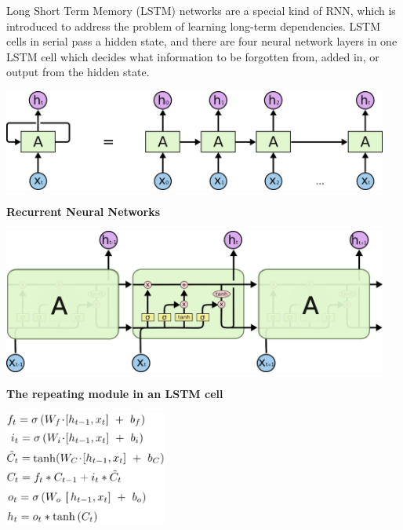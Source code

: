 \documentclass{article}
\begin{document}
Long Short Term Memory (LSTM) networks are a special kind of RNN, which is introduced to address the problem of learning long-term dependencies. LSTM cells in serial pass a hidden state, and there are four neural network layers in one LSTM cell which decides what information to be forgotten from, added in, or output from the hidden state.
\vspace{10pt}

\centerline{\includegraphics[width=5in]{rnn.png}}
\centerline{\textbf{Recurrent Neural Networks}}
\vspace{10pt}

\centerline{\includegraphics[width=5in]{lstm.png}}
\centerline{\textbf{The repeating module in an LSTM cell}}
\vspace{10pt}

\centerline{\includegraphics[width=2.1in]{lstm_formulas.png}}
\end{document}
